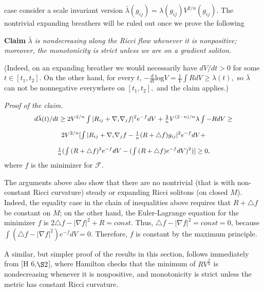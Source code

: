 \documentclass[12pt]{article}
\newcommand{\cF}{\mathcal {F}}
\theoremstyle{plain}
{\swapnumbers
\newtheorem{thm}{Theorem}[section]
\newtheorem{cor}[thm]{Corollary}
\newtheorem{lem}[thm]{Lemma}
\newtheorem{prop}[thm]{Proposition}
}
\theoremstyle{definition}
{\swapnumbers
\newtheorem{defn}[thm]{Definition}
\newtheorem{nota}[thm]{Notation}
\newtheorem{parag}[thm]{}
\newtheorem*{parstr}{\addtocounter{thm}{1}\thesection.\arabic{thm}*}
\newtheorem*{intropar}{\addtocounter{thm}{1}\arabic{thm}}
}
\theoremstyle{remark} {\swapnumbers
\newtheorem{rem}[thm]{Remark}
\newtheorem{exam}[thm]{Example}
\newtheorem{lemma}[thm]{Lemma}
\newtheorem{claim}[thm]{Claim}
}
\numberwithin{equation}{section}
\begin{document}
\begin{parag}
case consider a scale invariant version
$\bar{\lambda}(g_{ij})=\lambda(g_{ij})V^{2/n}(g_{ij}).$ The
nontrivial expanding breathers will be ruled out once we prove the
following
\par {\bf Claim} {\it $\bar{\lambda}$ is nondecreasing along the Ricci flow
whenever it is nonpositive; moreover, the monotonicity is strict
unless we are on a gradient soliton.} \par (Indeed, on an
expanding breather we would necessarily have $dV/dt>0$ for some $t
{\in } [t_1,t_2].$ On the other hand, for every $t$,
$-\frac{d}{dt}\mbox{log}V=\frac{1}{V}\int{RdV}\ge\lambda(t),$ so
$\bar{\lambda}$ can not be nonnegative everywhere on $[t_1,t_2], $
and the claim applies.)
\par {\it Proof of the claim.}
$${\small\begin{array}{cc}d\bar{\lambda}(t)/dt\ge2V^{2/n}\int{|R_{ij}+\nabla_i\nabla_j
f|^2e^{-f}dV}+\frac{2}{n}V^{(2-n)/n}\lambda\int{-RdV}\ge\\\\2V^{2/n}[\int{|R_{ij}+\nabla_i\nabla_j
f-\frac{1}{n}(R+\triangle
f)g_{ij}|^2e^{-f}dV}+\\\\\frac{1}{n}(\int{(R+\triangle
f)^2e^{-f}dV}-(\int{(R+\triangle
f)e^{-f}dV})^2)]\ge0,\end{array}}$$ where $f$ is the minimizer for
$\cF.$ \end{parag}\begin{parag}\par  The arguments above also show
that there are no nontrivial (that is with non-constant Ricci
curvature) steady or expanding Ricci solitons (on closed $M$).
Indeed, the equality case in the chain of inequalities above
requires that $R+\triangle f$ be constant on $M$; on the other
hand, the Euler-Lagrange equation for the minimizer $f$ is
$2\triangle f-|\nabla f|^2+R=const.$ Thus, $\triangle f-|\nabla
f|^2=const=0$, because $\int{(\triangle f-|\nabla
f|^2)e^{-f}dV}=0.$ Therefore, $f$ is constant by the maximum
principle.\end{parag}\begin{parstr}
\par  A similar, but simpler proof of the results in this
section, follows immediately from  [H 6,$\S 2$], where Hamilton
checks that the minimum of $RV^{\frac{2}{n}}$ is nondecreasing
whenever it is nonpositive, and monotonicity is strict unless the
metric has constant Ricci curvature.
\end{parstr}
\end{document}
